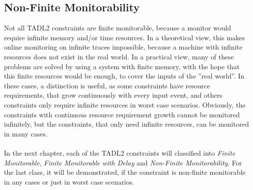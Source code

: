 	\subsection{Non-Finite Monitorability}
		Not all TADL2 constraints are finite monitorable, because a monitor would require infinite memory and/or time resources. In a theoretical view, this makes online monitoring on infinite traces impossible, because a machine with infinite resources does not exist in the real world. In a practical view, many of these problems are solved by using a system with finite memory, with the hope that this finite resources would be enough, to cover the inputs of the ''real world''. In these cases, a distinction is useful, as some constraints have resource requirements, that grow continuously with every input event, and others constraints only require infinite resources in worst case scenarios. Obviously, the constraints with continuous resource requirement growth cannot be monitored infinitely, but the constraints, that only need infinite resources, can be monitored in many cases.\\
		\\
		In the next chapter, each of the TADL2 constraints will classified into \emph{Finite Monitorable}, \emph{Finite Monitorable with Delay} and \emph{Non-Finite Monitorability}. For the last class, it will be demonstrated, if the constraint is non-finite monitorable in any cases or just in worst case scenarios.
		
		
			
		
		
	 